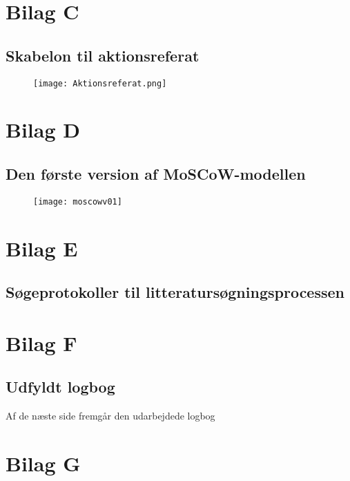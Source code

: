\newpage

\section{Bilag C}
\subsection{Skabelon til aktionsreferat}
\label{App:skabelonak}
\begin{figure}[htb]
\centering
\texttt{[image: Aktionsreferat.png]}	
\end{figure}

\newpage

\section{Bilag D}
\subsection{Den første version af MoSCoW-modellen}
\label{App:moscowv01}
\begin{figure}[htb]
\centering
\texttt{[image: moscowv01]}	
\end{figure}

\newpage

\section{Bilag E}
\subsection{Søgeprotokoller til litteratursøgningsprocessen}
\label{App:sogeprotokol}

\newpage

\section{Bilag F}
\subsection{Udfyldt logbog}
Af de næste side fremgår den udarbejdede logbog
\label{App:logbog}



\newpage
\section{Bilag G}
